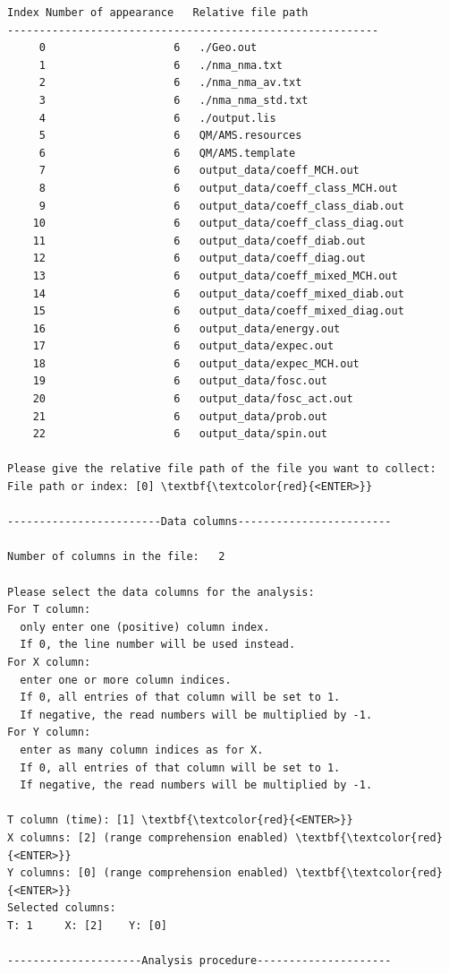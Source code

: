 \documentclass[a4paper,11pt,DIV=15,openany]{scrbook}
\begin{document}
\begin{oframed}
\begin{Verbatim}[commandchars=\\\{\}]
 Index Number of appearance   Relative file path
----------------------------------------------------------
     0                    6   ./Geo.out
     1                    6   ./nma_nma.txt
     2                    6   ./nma_nma_av.txt
     3                    6   ./nma_nma_std.txt
     4                    6   ./output.lis
     5                    6   QM/AMS.resources
     6                    6   QM/AMS.template
     7                    6   output_data/coeff_MCH.out
     8                    6   output_data/coeff_class_MCH.out
     9                    6   output_data/coeff_class_diab.out
    10                    6   output_data/coeff_class_diag.out
    11                    6   output_data/coeff_diab.out
    12                    6   output_data/coeff_diag.out
    13                    6   output_data/coeff_mixed_MCH.out
    14                    6   output_data/coeff_mixed_diab.out
    15                    6   output_data/coeff_mixed_diag.out
    16                    6   output_data/energy.out
    17                    6   output_data/expec.out
    18                    6   output_data/expec_MCH.out
    19                    6   output_data/fosc.out
    20                    6   output_data/fosc_act.out
    21                    6   output_data/prob.out
    22                    6   output_data/spin.out

Please give the relative file path of the file you want to collect:
File path or index: [0] \textbf{\textcolor{red}{<ENTER>}}

------------------------Data columns------------------------

Number of columns in the file:   2

Please select the data columns for the analysis:
For T column: 
  only enter one (positive) column index. 
  If 0, the line number will be used instead.
For X column: 
  enter one or more column indices. 
  If 0, all entries of that column will be set to 1. 
  If negative, the read numbers will be multiplied by -1.
For Y column: 
  enter as many column indices as for X. 
  If 0, all entries of that column will be set to 1. 
  If negative, the read numbers will be multiplied by -1.

T column (time): [1] \textbf{\textcolor{red}{<ENTER>}}
X columns: [2] (range comprehension enabled) \textbf{\textcolor{red}{<ENTER>}}
Y columns: [0] (range comprehension enabled) \textbf{\textcolor{red}{<ENTER>}}
Selected columns:
T: 1     X: [2]    Y: [0]

---------------------Analysis procedure---------------------


\end{Verbatim}
\end{oframed}
\end{document}
